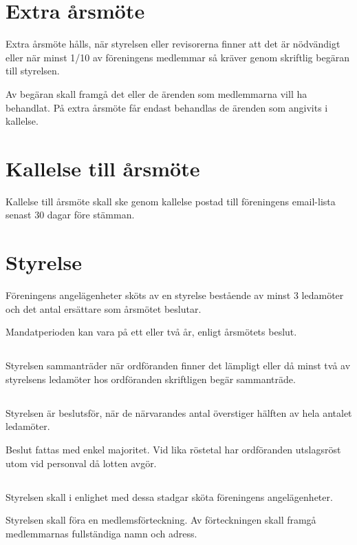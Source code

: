 \documentclass[11pt, a4paper]{article}
\begin{document}
\section{Extra årsmöte}
Extra årsmöte hålls, när styrelsen eller revisorerna finner att det är nödvändigt eller när minst 1/10 av föreningens medlemmar så kräver genom skriftlig begäran till styrelsen.

Av begäran skall framgå det eller de ärenden som medlemmarna vill ha behandlat. På extra årsmöte får endast behandlas de ärenden som angivits i kallelse.

\section{Kallelse till årsmöte}
Kallelse till årsmöte skall ske genom kallelse postad till föreningens email-lista senast 30 dagar före stämman.

\section{Styrelse}
Föreningens angelägenheter sköts av en styrelse bestående av minst 3 ledamöter och det antal ersättare som årsmötet beslutar.

Mandatperioden kan vara på ett eller två år, enligt årsmötets beslut.

\subsection{}
Styrelsen sammanträder när ordföranden finner det lämpligt eller då minst två av styrelsens ledamöter hos ordföranden skriftligen begär sammanträde.

\subsection{}
Styrelsen är beslutsför, när de närvarandes antal överstiger hälften av hela antalet ledamöter.

Beslut fattas med enkel majoritet. Vid lika röstetal har ordföranden utslagsröst utom vid personval då lotten avgör.

\subsection{}
Styrelsen skall i enlighet med dessa stadgar sköta föreningens angelägenheter.

Styrelsen skall föra en medlemsförteckning. Av förteckningen skall framgå medlemmarnas fullständiga namn och adress.
\end{document}
